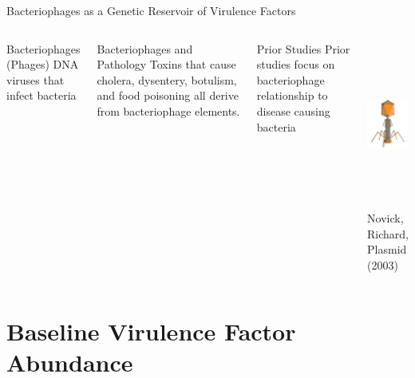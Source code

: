 \documentclass[11pt]{beamer}
\begin{document}
	\begin{frame}{Bacteriophages as a Genetic Reservoir of Virulence Factors}
	\begin{columns}
	\begin{block}{Bacteriophages (Phages)}
	DNA viruses that infect bacteria
	\end{block}
	
	
	\begin{block}{Bacteriophages and Pathology}
	Toxins that cause cholera, dysentery, botulism, and food poisoning all derive from bacteriophage elements.
	\end{block}
		
		
	\begin{block}{Prior Studies}
	Prior studies focus on bacteriophage relationship to disease causing bacteria
	\end{block}
	
	\includegraphics[height=5.5cm, width=5cm]{phage.png} \\
	\tiny{Novick, Richard, Plasmid (2003)}
	\end{columns}
		
	
	\end{frame}

	
\section{Baseline Virulence Factor Abundance}
\subsection{}
\end{document}
